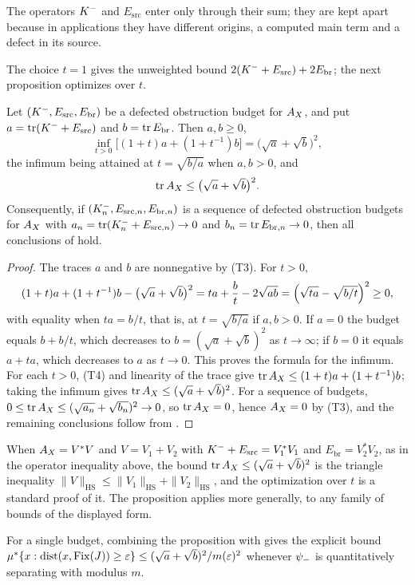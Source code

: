 The operators \(K^{-}\) and \(E_{\mathrm{src}}\) enter only through
their sum; they are kept apart because in applications they have
different origins, a computed main term and a defect in its source.

The choice \(t=1\) gives the unweighted bound
\(2(K^{-}+E_{\mathrm{src}})+2E_{\mathrm{br}}\); the next proposition
optimizes over \(t\).

\begin{proposition}
\label{prop:duality_confinement:optimized-trace-budget}
Let \((K^{-},E_{\mathrm{src}},E_{\mathrm{br}})\) be a defected
obstruction budget for \(A_{X}\), and put
\(a=\operatorname{tr}(K^{-}+E_{\mathrm{src}})\) and \(b=\operatorname{tr} E_{\mathrm{br}}\).
Then \(a,b\geq0\),
\[
  \inf_{t>0}\bigl[(1+t)a+(1+t^{-1})b\bigr]
  =\bigl(\sqrt a+\sqrt b\bigr)^2,
\]
the infimum being attained at \(t=\sqrt{b/a}\) when \(a,b>0\), and
\[
  \operatorname{tr}A_{X}\leq\bigl(\sqrt a+\sqrt b\bigr)^2 .
\]
Consequently, if \((K^{-}_n,E_{\mathrm{src},n},E_{\mathrm{br},n})\)
is a sequence of defected obstruction budgets for \(A_{X}\) with
\(a_n=\operatorname{tr}(K^{-}_n+E_{\mathrm{src},n})\to0\) and
\(b_n=\operatorname{tr} E_{\mathrm{br},n}\to0\), then all conclusions of
 hold.
\end{proposition}

\begin{proof}
The traces \(a\) and \(b\) are nonnegative by (T3).  For \(t>0\),
\[
  (1+t)a+(1+t^{-1})b-\bigl(\sqrt a+\sqrt b\bigr)^2
  =ta+\frac bt-2\sqrt{ab}
  =\Bigl(\sqrt{ta}-\sqrt{b/t}\Bigr)^2\geq0,
\]
with equality when \(ta=b/t\), that is, at \(t=\sqrt{b/a}\) if
\(a,b>0\).  If \(a=0\) the budget equals \(b+b/t\), which decreases to
\(b=(\sqrt a+\sqrt b)^2\) as \(t\to\infty\); if \(b=0\) it equals
\(a+ta\), which decreases to \(a\) as \(t\to0\).  This proves the
formula for the infimum.  For each \(t>0\), (T4) and linearity of the
trace give \(\operatorname{tr}A_{X}\leq(1+t)a+(1+t^{-1})b\); taking the infimum
gives \(\operatorname{tr}A_{X}\leq(\sqrt a+\sqrt b)^2\).  For a sequence of budgets,
\(0\leq\operatorname{tr}A_{X}\leq(\sqrt{a_n}+\sqrt{b_n})^2\to0\), so
\(\operatorname{tr}A_{X}=0\), hence \(A_{X}=0\) by (T3), and the remaining
conclusions follow from
.
\end{proof}

When \(A_{X}=V^*V\) and \(V=V_1+V_2\) with
\(K^{-}+E_{\mathrm{src}}=V_1^*V_1\) and \(E_{\mathrm{br}}=V_2^*V_2\),
as in the operator inequality above, the bound
\(\operatorname{tr}A_{X}\leq(\sqrt a+\sqrt b)^2\) is the triangle inequality
\(\|V\|_{\mathrm{HS}}\leq\|V_1\|_{\mathrm{HS}}+\|V_2\|_{\mathrm{HS}}\),
and the optimization over \(t\) is a standard proof of it.  The
proposition applies more generally, to any family of bounds of the
displayed form.

For a single budget, combining the proposition with
 gives the
explicit bound
\(\mu^*\{x:\operatorname{dist}(x,\operatorname{Fix}(J))\geq\varepsilon\}\leq
(\sqrt a+\sqrt b)^2/m(\varepsilon)^2\) whenever \(\psi_{-}\) is
quantitatively separating with modulus \(m\).
